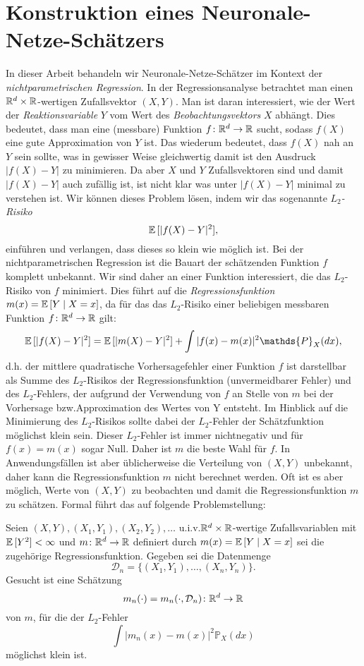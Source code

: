 \chapter{Konstruktion eines Neuronale-Netze-Schätzers}
\label{chap:2}

In dieser Arbeit behandeln wir Neuronale-Netze-Schätzer im Kontext der \emph{nichtparametrischen Regression}.
In der Regressionsanalyse betrachtet man einen $\mathbb{R}^d \times \mathbb{R}$-wertigen Zufallsvektor $(X,Y)$. Man ist daran interessiert, wie der Wert der \emph{Reaktionsvariable} $Y$ vom Wert des \emph{Beobachtungsvektors} $X$ abhängt. Dies bedeutet, dass man eine (messbare) Funktion $f\colon \mathbb{R}^d \to \mathbb{R}$ sucht, sodass $f(X)$ eine \glqq gute Approximation von $Y$\grqq{} ist. Das wiederum bedeutet, dass $f(X)$ nah an $Y$ sein sollte, was in gewisser Weise gleichwertig damit ist den Ausdruck $|f(X) - Y|$ zu \glqq minimieren\grqq. Da aber $X$ und $Y$ Zufallsvektoren sind und damit $|f(X) - Y|$ auch zufällig ist, ist nicht klar was unter \glqq $|f(X) - Y|$ minimal\grqq{} zu verstehen ist. Wir können dieses Problem lösen, indem wir das sogenannte \emph{$L_2$-Risiko} 
$$
\mathbb{E}\,[|f(X) - Y|^2],
$$
einführen und verlangen, dass dieses so klein wie möglich ist.
Bei der nichtparametrischen Regression ist die Bauart der schätzenden Funktion $f$ komplett unbekannt. Wir sind daher an einer Funktion interessiert, die das $L_2$-Risiko von $f$ minimiert. Dies führt auf die \emph{Regressionsfunktion} $m(x) = \mathbb{E}\,[Y \mid X = x]$, da für das das $L_2$-Risiko einer beliebigen messbaren Funktion $f\colon \mathbb{R}^d \to \mathbb{R}$  gilt:
$$\E[|f(X) - Y|^2] = \E[|m(X) - Y|^2] + \int|f(x) - m(x)|^2 \mathds{P}_X (dx),$$
d.h. der mittlere quadratische Vorhersagefehler einer Funktion $f$ ist darstellbar als Summe des $L_2$-Risikos der Regressionsfunktion (unvermeidbarer Fehler) und des $L_2$-Fehlers, der aufgrund der Verwendung von $f$ an Stelle von $m$ bei der Vorhersage bzw.\@ Approximation des Wertes von Y entsteht. Im Hinblick auf die Minimierung des $L_2$-Risikos sollte dabei der $L_2$-Fehler der Schätzfunktion möglichst klein sein. Dieser $L_2$-Fehler ist immer nichtnegativ und für $f(x) = m(x)$ sogar Null. Daher ist $m$ die beste Wahl für $f.$
In Anwendungsfällen ist aber üblicherweise die Verteilung von $(X, Y)$ unbekannt, daher kann die Regressionsfunktion $m$ nicht berechnet werden. Oft ist es aber möglich, Werte von $(X, Y)$ zu beobachten und damit die Regressionsfunktion $m$ zu schätzen. Formal führt das auf folgende Problemstellung:
\begin{prblm}
\label{prblm:1}
Seien $(X, Y), (X_1, Y_1), (X_2, Y_2), \dots$ u.i.v.\@ $\mathbb{R}^d \times \mathbb{R}$-wertige Zufallsvariablen mit $\mathbb{E}\,[Y^2] < \infty$ und $m\colon\mathbb{R}^d \to \mathbb{R}$ definiert durch $m(x) = \mathbb{E}\,[Y \mid X = x]$ sei die zugehörige Regressionsfunktion. Gegeben sei die Datenmenge 
\begin{equation}
\label{dataset}
\mathcal{D}_n = \{(X_1, Y_1),\dots,(X_n, Y_n)\}.
\end{equation}
Gesucht ist eine Schätzung 
$$m_n(\cdot) = m_n(\cdot, \mathcal{D}_n)\colon\mathbb{R}^d \to \mathbb{R} $$
von $m$, für die der $L_2$-Fehler 
$$\int |m_n(x) - m(x)|^2 \mathds{P}_X(dx)$$
möglichst \glqq klein\grqq{} ist. 
\end{prblm}
